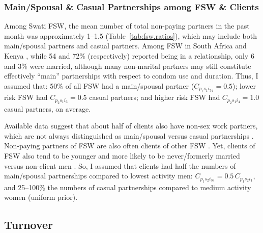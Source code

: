 \subsubsection{Main/Spousal \& Casual Partnerships among FSW \& Clients}\label{model.par.nsw.sw}
Among Swati FSW, the mean number of total non-paying partners in the past month was
approximately 1--1.5 (Table~\ref{tab:fsw.ratios}),
which may include both main/spousal partners and casual partners.
Among FSW in South Africa \cite{Wells2018} and Kenya \cite{Voeten2007},
while 54 and 72\% (respectively) reported being in a relationship, only 6 and 3\% were married,
although many non-marital partners may still constitute effectively ``main'' partnerships
with respect to condom use and duration.
Thus, I assumed that:
50\% of all FSW had a main/spousal partner (\ie $C_{p_{1}s_{1}i_{34}} = 0.5$);
lower risk FSW had $C_{p_{2}s_{1}i_{3}} = 0.5$ casual partners; and
higher risk FSW had $C_{p_{2}s_{1}i_{4}} = 1.0$ casual partners, on average.
\par
Available data suggest that about half of clients also have non-sex work partners,
which are not always distinguished as main/spousal versus casual partnerships
\cite{Lowndes2000,Santo2005}.
Non-paying partners of FSW are also often clients of other FSW \cite{Voeten2007,Godin2008}.
Yet, clients of FSW also tend to be younger and more likely to be
never/formerly married versus non-client men \cite{Lowndes2000,Carael2006}.
So, I assumed that clients had
half the numbers of main/spousal partnerships compared to lowest activity men:
$C_{p_{1}s_{2}i_{34}} = 0.5\,C_{p_{1}s_{2}i_{1}}$, and
25--100\% the numbers of casual partnerships compared to medium activity women (uniform prior).
\subsection{Turnover}\label{model.par.turnover}
